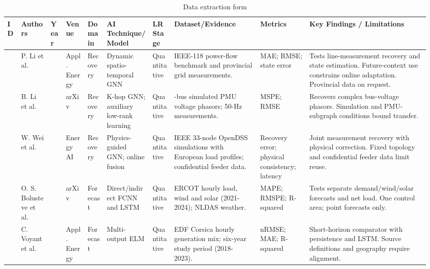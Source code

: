 \begin{table}[!t]
\caption{Data extraction form}
\centering\fontsize{8}{9.3}\selectfont\setlength{\tabcolsep}{2pt}
\begin{tabular}{>{\raggedright\arraybackslash}p{18pt}>{\raggedright\arraybackslash}p{40pt}>{\raggedright\arraybackslash}p{24pt}>{\raggedright\arraybackslash}p{45pt}>{\raggedright\arraybackslash}p{38pt}>{\raggedright\arraybackslash}p{51pt}>{\raggedright\arraybackslash}p{42pt}>{\raggedright\arraybackslash}p{85pt}>{\raggedright\arraybackslash}p{42pt}>{\raggedright\arraybackslash}p{91pt}}\toprule
ID & Authors & Year & Venue & Domain & AI Technique/Model & LR Stage & Dataset/Evidence & Metrics & Key Findings / Limitations \\ \midrule
\cite{S28} & P. Li et al. & 2026 & Appl. Energy & Recovery & Dynamic spatio-temporal GNN & Quantitative & IEEE-118 power-flow benchmark and provincial grid measurements.~\cite{IEEE118Data} & MAE; RMSE; state error & Tests line-measurement recovery and state estimation. Future-context use constrains online adaptation. Provincial data on request. \\[4pt]
\cite{N01} & B. Li et al. & 2025 & arXiv & Recovery & K-hop GNN; auxiliary low-rank learning & Quantitative & 145-bus simulated PMU voltage phasors; 50-Hz measurements. & MSPE; RMSE & Recovers complex bus-voltage phasors. Simulation and PMU-subgraph conditions bound transfer. \\[4pt]
\cite{S29} & W. Wei et al. & 2026 & Energy AI & Recovery & Physics-guided GNN; online fusion & Quantitative & IEEE 33-node OpenDSS simulations with European load profiles; confidential feeder data. & Recovery error; physical consistency; latency & Joint measurement recovery with physical correction. Fixed topology and confidential feeder data limit reuse. \\[4pt]
\cite{S25} & O. S. Bolusteve et al. & 2026 & arXiv & Forecast & Direct/indirect FCNN and LSTM & Quantitative & ERCOT hourly load, wind and solar (2021-2024); NLDAS weather.~\cite{ERCOTData,NLDASData} & MAPE; RMSPE; R-squared & Tests separate demand/wind/solar forecasts and net load. One control area; point forecasts only. \\[4pt]
\cite{S20} & C. Voyant et al. & 2026 & Appl. Energy & Forecast & Multi-output ELM & Quantitative & EDF Corsica hourly generation mix; six-year study period (2018-2023).~\cite{CorsicaData} & nRMSE; MAE; R-squared & Short-horizon comparator with persistence and LSTM. Source definitions and geography require alignment. \\[4pt]

\end{tabular}
\end{table}
